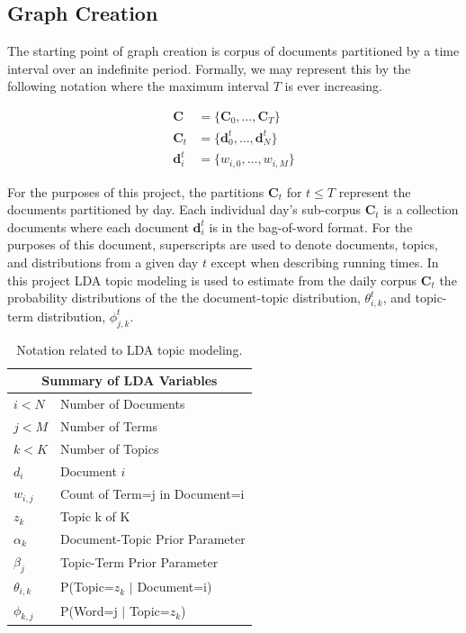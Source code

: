 \documentclass[10pt]{article}
\begin{document}
\subsection {Graph Creation}
The starting point of graph creation is corpus of documents partitioned by a time interval over an indefinite period.   Formally, we may represent this by the following notation where the maximum interval $T$ is ever increasing.  

\begin{align}
\mathbf{C} &= \{ \mathbf{C}_0, \dots, \mathbf{C}_T \} \\
\mathbf{C}_t &= \{\mathbf{d}_0^t, \dots, \mathbf{d}_N^t \} \\
\mathbf{d}_i^t &= \{ w_{i,0}, \dots, w_{i,M} \}
\end{align}

For the purposes of this project, the partitions $\mathbf{C}_t$ for $t \le T$ represent the documents partitioned by day.  Each individual day's sub-corpus $\mathbf{C}_t$ is a collection documents where each document $\mathbf{d}_i^t$ is in the bag-of-word format.  For the purposes of this document, superscripts are used to denote documents, topics, and distributions from a given day $t$ except when describing running times.  In this project LDA topic modeling is used to estimate from the daily corpus $\mathbf{C}_t$ the probability distributions of the the document-topic distribution, $\theta_{i,k}^t$, and topic-term distribution, $\phi_{j,k}^t$.

\begin{table}
\begin{center}
\begin{tabular}{|l|l|}
  \hline
  \multicolumn{2}{|c|}{Summary of LDA Variables} \\
  \hline
  $i < N$ & Number of Documents \\
  $j < M$ & Number of Terms \\
  $k < K$ & Number of Topics \\
  $d_i$ & Document $i$ \\
  $w_{i, j}$ & Count of Term=j in Document=i \\
  $z_k$ & Topic k of K \\
  \emph{$\alpha_k$} & Document-Topic Prior Parameter\\
  \emph{$\beta_j$} & Topic-Term Prior Parameter \\
  $\theta_{i,k}$ & P(Topic=$z_k$ $\vert$ Document=i) \\
  $\phi_{k,j}$ & P(Word=j $\vert$ Topic=$z_k$) \\
  \hline
\end{tabular}
\caption{Notation related to LDA topic modeling.}
\end{center}
\end{table}
\end{document}
